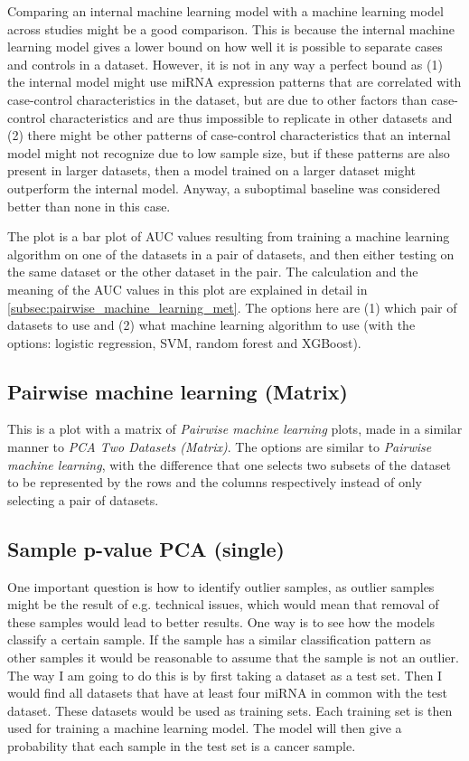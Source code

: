 {{{{{{{{{{{{{{{Comparing an internal machine learning model with a machine learning model across studies might be a good comparison. This is because the internal machine learning model gives a lower bound on how well it is possible to separate cases and controls in a dataset. However, it is not in any way a perfect bound as (1) the internal model might use miRNA expression patterns that are correlated with case-control characteristics in the dataset, but are due to other factors than case-control characteristics and are thus impossible to replicate in other datasets and (2) there might be other patterns of case-control characteristics that an internal model might not recognize due to low sample size, but if these patterns are also present in larger datasets, then a model trained on a larger dataset might outperform the internal model. Anyway, a suboptimal baseline was considered better than none in this case.

The plot is a bar plot of AUC values resulting from training a machine learning algorithm on one of the datasets in a pair of datasets, and then either testing on the same dataset or the other dataset in the pair. The calculation and the meaning of the AUC values in this plot are explained in detail in \autoref{subsec:pairwise_machine_learning_met}. The options here are (1) which pair of datasets to use and (2) what machine learning algorithm to use (with the options: logistic regression, SVM, random forest and XGBoost).

\subsection{Pairwise machine learning (Matrix)}

This is a plot with a matrix of \textit{Pairwise machine learning} plots, made in a similar manner to \textit{PCA Two Datasets (Matrix)}. The options are similar to \textit{Pairwise machine learning}, with the difference that one selects two subsets of the dataset to be represented by the rows and the columns respectively instead of only selecting a pair of datasets.

\subsection{Sample p-value PCA (single)}

One important question is how to identify outlier samples, as outlier samples might be the result of e.g. technical issues, which would mean that removal of these samples would lead to better results. One way is to see how the models classify a certain sample. If the sample has a similar classification pattern as other samples it would be reasonable to assume that the sample is not an outlier. The way I am going to do this is by first taking a dataset as a test set. Then I would find all datasets that have at least four miRNA in common with the test dataset. These datasets would be used as training sets. Each training set is then used for training a machine learning model. The model will then give a probability that each sample in the test set is a cancer sample.

}}}}}}}}}}}}}}}
